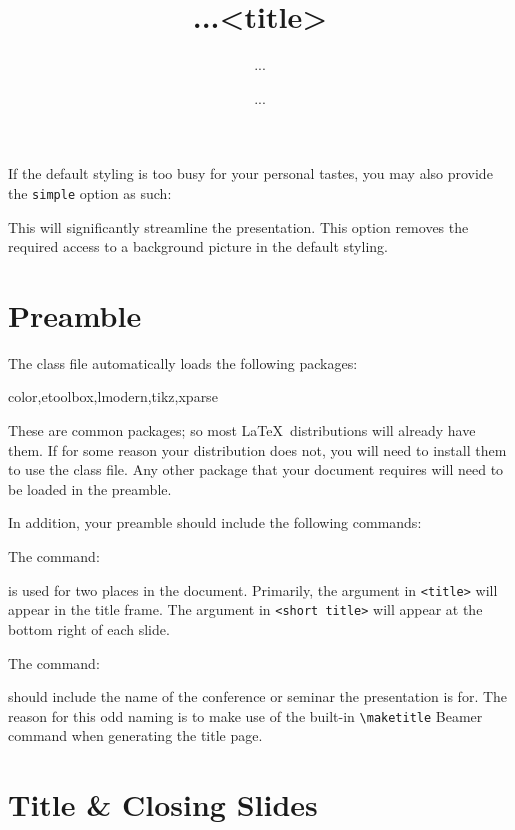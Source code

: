 \documentclass[11pt]{article}
\begin{document}
If the default styling is too busy for your personal tastes, you may also provide the \lstinline[basicstyle=\ttfamily]!simple! option as such:
\begin{tex}
\end{tex}
This will significantly streamline the presentation.  This option removes the required access to a background picture in the default styling.

\section{Preamble}

The class file automatically loads the following packages:
\begin{tex}
color,etoolbox,lmodern,tikz,xparse
\end{tex}
These are common packages; so most \LaTeX\ distributions will already have them.  If for some reason your distribution does not, you will need to install them to use the class file.  Any other package that your document requires will need to be loaded in the preamble.

In addition, your preamble should include the following commands:
\begin{tex}
\title[...]{...}  %
\author{...}      %
\date{...}        %
\end{tex}

The command:
\begin{tex}
\title[<short title>]{<title>}
\end{tex}
is used for two places in the document.  Primarily, the argument in \lstinline[basicstyle=\ttfamily]!<title>! will appear in the title frame.  The argument in \lstinline[basicstyle=\ttfamily]!<short title>! will appear at the bottom right of each slide.

The command:
\begin{tex}
\end{tex}
should include the name of the conference or seminar the presentation is for.  The reason for this odd naming is to make use of the built-in \lstinline[basicstyle=\ttfamily]!\maketitle! Beamer command when generating the title page.

\section{Title \& Closing Slides}
\end{document}
